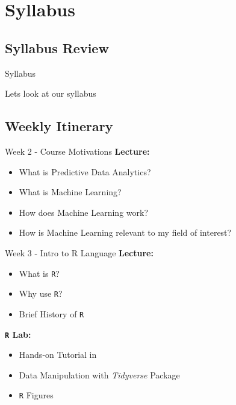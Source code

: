 \documentclass[aspectratio=169,xcolor=dvipsnames]{beamer}
\begin{document}
\section{Syllabus}
\subsection{Syllabus Review}
\begin{frame}{Syllabus}
    \begin{center}
        Lets look at our syllabus
    \end{center}
\end{frame}

\subsection{Weekly Itinerary}
\begin{frame}{Week 2 - Course Motivations}
\textbf{Lecture:}
    \begin{itemize}
        \setlength{\itemsep}{.25cm}
        \item What is Predictive Data Analytics?
        \item What is Machine Learning? %
        \item How does Machine Learning work?
        \item How is Machine Learning relevant to my field of interest?
    \end{itemize}
\end{frame}

\begin{frame}{Week 3 - Intro to R Language}
\textbf{Lecture:}
    \begin{itemize}
        \setlength{\itemsep}{.25cm}
        \item What is \texttt{R}?
        \item Why use \texttt{R}?
        \item Brief History of \texttt{R}
    \end{itemize}
\textbf{\texttt{R} Lab:}
    \begin{itemize}
        \setlength{\itemsep}{.25cm}
        \item Hands-on Tutorial in 
        \item Data Manipulation with \textit{Tidyverse} Package
        \item \texttt{R} Figures
    \end{itemize}
\end{frame}
\end{document}
